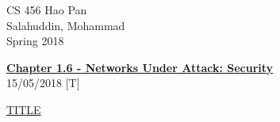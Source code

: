 \documentclass{article}
\begin{document}
\noindent
{CS 456 \hfill Hao Pan}\\
{Salahuddin, Mohammad}\\
{Spring 2018}


\begin{center}
\underline{\large \bf Chapter 1.6 - Networks Under Attack: Security}\\
\noindent
{\hfill 15/05/2018 [T]}
\end{center}

\underline{TITLE}
\end{document}
